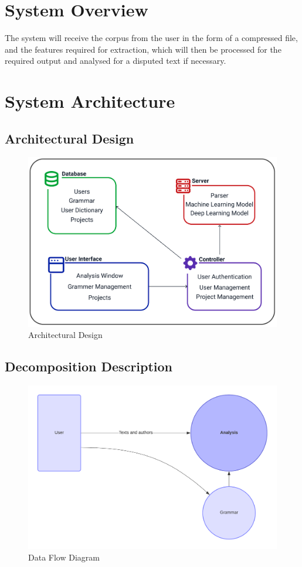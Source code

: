 \documentclass[12pt]{article}
\begin{document}
\section{System Overview}
The system will receive the corpus from the user in the form of a compressed file, and the features required for extraction, which will then be processed for the required output and analysed for a disputed text if necessary.

\section{System Architecture}
\subsection{Architectural Design}

\begin{figure}[tbh]
  \centering
  \includegraphics[width=0.7\linewidth]{Images/System Overview.png}
  \caption{Architectural Design}
  \label{fig:image}
\end{figure}


\subsection{Decomposition Description}
\begin{figure}[H]
  \includegraphics[width=15cm]{Images/DFD}
  \caption{Data Flow Diagram}
\end{figure}
\end{document}
